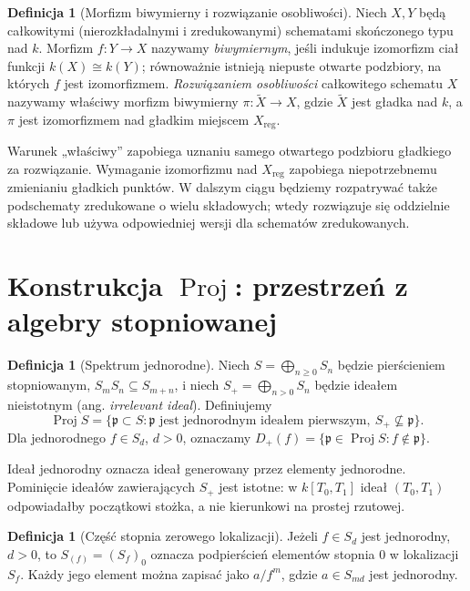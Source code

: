 \documentclass[11pt,a4paper,openany]{report}
\numberwithin{equation}{section}
\theoremstyle{plain}
\theoremstyle{definition}
\newtheorem{definicja}[twierdzenie]{Definicja}
\theoremstyle{remark}
\begin{document}
\begin{definicja}[Morfizm biwymierny i rozwiązanie osobliwości]
\label{def:ga5-resolution}
Niech $X,Y$ będą całkowitymi (nierozkładalnymi i zredukowanymi)
schematami skończonego typu nad $k$. Morfizm $f:Y\to X$
nazywamy \emph{biwymiernym}, jeśli indukuje izomorfizm ciał
funkcji $k(X)\cong k(Y)$; równoważnie istnieją niepuste
otwarte podzbiory, na których $f$ jest izomorfizmem.
\emph{Rozwiązaniem osobliwości} całkowitego schematu $X$
nazywamy właściwy morfizm biwymierny $\pi:\widetilde X\to X$,
gdzie $\widetilde X$ jest gładka nad $k$, a $\pi$ jest
izomorfizmem nad gładkim miejscem $X_{\mathrm{reg}}$.
\end{definicja}

Warunek „właściwy” zapobiega uznaniu samego otwartego
podzbioru gładkiego za rozwiązanie. Wymaganie izomorfizmu
nad $X_{\mathrm{reg}}$ zapobiega niepotrzebnemu zmienianiu
gładkich punktów. W dalszym ciągu będziemy rozpatrywać
także podschematy zredukowane o wielu składowych;
wtedy rozwiązuje się oddzielnie składowe lub używa
odpowiedniej wersji dla schematów zredukowanych.

\section{Konstrukcja \texorpdfstring{$\operatorname{Proj}$}{Proj}: przestrzeń z algebry stopniowanej}
\label{sec:ga5-proj}

\begin{definicja}[Spektrum jednorodne]
Niech $S=\bigoplus_{n\ge0}S_n$ będzie pierścieniem
stopniowanym, $S_mS_n\subseteq S_{m+n}$, i niech
$S_+=\bigoplus_{n>0}S_n$ będzie ideałem nieistotnym
(ang. \emph{irrelevant ideal}). Definiujemy
\[
 \operatorname{Proj}S=
 \{\mathfrak p\subset S:\mathfrak p\text{ jest jednorodnym ideałem
 pierwszym},\ S_+\not\subseteq\mathfrak p\}.
\]
Dla jednorodnego $f\in S_d$, $d>0$, oznaczamy
$D_+(f)=\{\mathfrak p\in\operatorname{Proj}S:f\notin\mathfrak p\}$.
\end{definicja}

Ideał jednorodny oznacza ideał generowany przez elementy
jednorodne. Pominięcie ideałów zawierających $S_+$ jest
istotne: w $k[T_0,T_1]$ ideał $(T_0,T_1)$ odpowiadałby
początkowi stożka, a nie kierunkowi na prostej rzutowej.

\begin{definicja}[Część stopnia zerowego lokalizacji]
Jeżeli $f\in S_d$ jest jednorodny, $d>0$, to
$S_{(f)}=(S_f)_0$ oznacza podpierścień elementów stopnia
$0$ w lokalizacji $S_f$. Każdy jego element można zapisać
jako $a/f^m$, gdzie $a\in S_{md}$ jest jednorodny.
\end{definicja}
\end{document}

